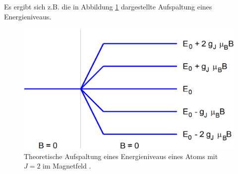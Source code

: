 Es ergibt sich z.B. die in Abbildung \ref{fig:generelleAufspaltung} dargestellte Aufspaltung eines Energieniveaus.
\begin{figure}
	\centering
	\includegraphics[width=\linewidth-150pt,height=\textheight-150pt,keepaspectratio]{content/Images/generelleAufspaltung.png}
    \caption{Theoretische Aufspaltung eines Energieniveaus eines Atoms mit $J=2$ im Magnetfeld \cite{V27}.}
    \label{fig:generelleAufspaltung}
\end{figure}

